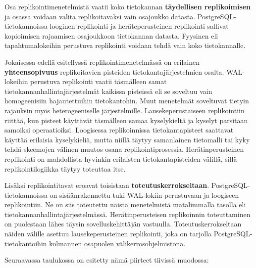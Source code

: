 \documentclass[finnish,twoside,censored,csm,sw-track-2018]{HYthesisML}
\begin{document}
Osa replikointimenetelmistä vaatii koko tietokannan \textbf{täydellisen replikoimisen} ja osassa voidaan valita replikoitavaksi vain osajoukko datasta. PostgreSQL-tietokannoissa looginen replikointi ja heräteperusteinen replikointi sallivat kopioimisen rajaamisen osajoukkoon tietokannan datasta. Fyysinen eli tapahtumalokeihin perustuva replikointi voidaan tehdä vain koko tietokannalle.

Jokaisessa edellä esitellyssä replikointimenetelmässä on erilainen \textbf{yhteensopivuus} replikoitavien pisteiden tietokantajärjestelmien osalta. WAL-lokeihin perustuva replikointi vaatii täsmälleen samat tietokannanhallintajärjestelmät kaikissa pisteissä eli se soveltuu vain homogeenisiin hajautettuihin tietokantohin. Muut menetelmät soveltuvat tietyin rajauksin myös heterogeeniselle järjestelmille. Lausekeperustaiseen replikointiin riittää, kun pisteet käyttävät täsmälleen samaa kyselykieltä ja kyselyt parsitaan samoiksi operaatioiksi. Loogisessa replikoinnissa tietokantapisteet saattavat käyttää erilaisia kyselykieliä, mutta niillä täytyy samanlainen tietomalli tai kyky tehdä skeemojen välinen muutos osana replikointiprosessia. Herätinperusteinen replikointi on mahdollista hyvinkin erilaisten tietokantapisteiden välillä, sillä replikointilogiikka täytyy toteuttaa itse.

Lisäksi replikointitavat eroavat toisistaan \textbf{toteutuskerrokseltaan}. PostgreSQL-tietokan\-noissa on sisäänrakennettu tuki WAL-lokiin perustuvaan ja loogiseen replikointiin. Ne on siis toteutettu näistä menetelmistä matalimmalla tasolla eli tietokannanhallintajärjestel\-mässä. Herätinperusteisen replikoinnin toteuttaminen on puolestaan lähes täysin sovelluskehittäjän vastuulla. Toteutuskerrokseltaan näiden välille asettuu lausekeperusteinen replikointi, joka on tarjolla PostgreSQL-tietokantoihin kolmannen osapuolen välikerrosohjelmistona.

Seuraavassa taulukossa on esitetty nämä piirteet tiivissä muodossa:
\end{document}
